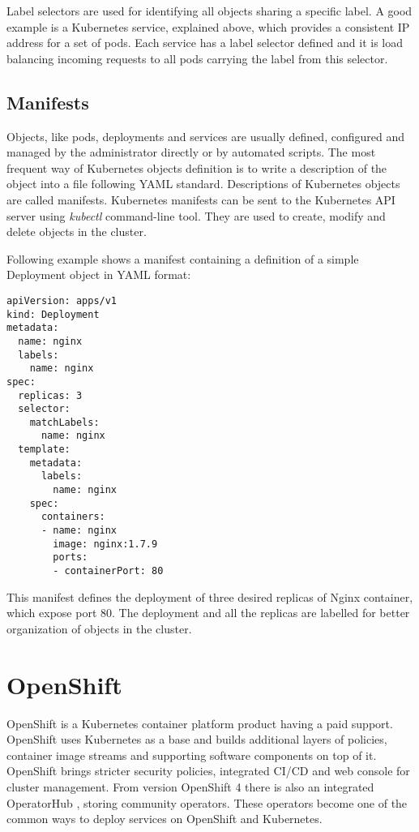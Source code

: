 \documentclass[
  digital, %
  twoside, %
  table,   %
  nolof,   %
  nolot,   %
]{fithesis3}
\begin{document}
Label selectors are used for identifying all objects sharing a specific label. A good example is a Kubernetes service, explained above, which provides a consistent IP address for a set of pods. Each service has a label selector defined and it is load balancing incoming requests to all pods carrying the label from this selector.

\subsection{Manifests} \label{sec:manifest}
Objects, like pods, deployments and services are usually defined, configured and managed by the administrator directly or by automated scripts. The most frequent way of Kubernetes objects definition is to write a description of the object into a file following YAML \cite{YAML} standard. Descriptions of Kubernetes objects are called manifests. Kubernetes manifests can be sent to the Kubernetes API server \cite{kubernetes-api} using \textit{kubectl} \cite{kubectl} command-line tool. They are used to create, modify and delete objects in the cluster.

Following example shows a manifest containing a definition of a simple Deployment object in YAML format:
\begin{lstlisting}
apiVersion: apps/v1
kind: Deployment
metadata:
  name: nginx
  labels:
    name: nginx
spec:
  replicas: 3
  selector:
    matchLabels:
      name: nginx
  template:
    metadata:
      labels:
        name: nginx
    spec:
      containers:
      - name: nginx
        image: nginx:1.7.9
        ports:
        - containerPort: 80
\end{lstlisting}

This manifest defines the deployment of three desired replicas of Nginx \cite{nginx} container, which expose port 80. The deployment and all the replicas are labelled for better organization of objects in the cluster.

\section{OpenShift} \label{sec:openshift}
OpenShift \cite{rhccos} is a Kubernetes container platform product having a paid support. OpenShift uses Kubernetes as a base and builds additional layers of policies, container image streams and supporting software components on top of it. OpenShift brings stricter security policies, integrated CI/CD and web console for cluster management. From version OpenShift 4 there is also an integrated OperatorHub \cite{operatorhub}, storing community operators. These operators become one of the common ways to deploy services on OpenShift and Kubernetes.
\end{document}
